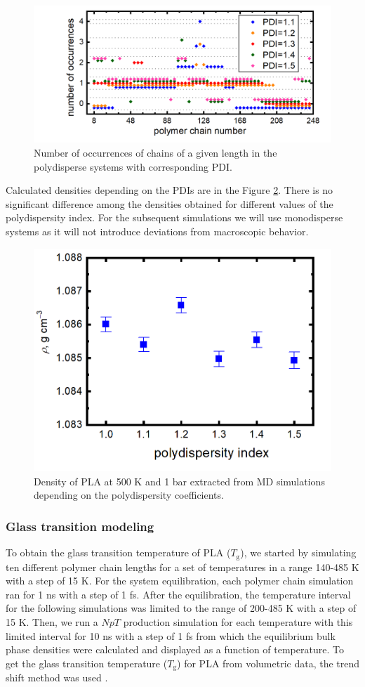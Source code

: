 \begin{figure}[htb]
	\centering
	\includegraphics[width=1\hsize]{img/polydispersity_occurences_new.png}
	\caption{Number of occurrences of chains of a given length in the polydisperse systems with corresponding PDI.}
	\label{fig:polydisperzita_vyskyt}
\end{figure}       

Calculated densities depending on the PDIs are in the Figure \ref{fig:polydisperzita}. There is no significant difference among the densities obtained for different values of the polydispersity index. For the subsequent simulations we will use monodisperse systems as it will not introduce deviations from macroscopic behavior. 

\begin{figure}[htb]
	\centering
	\includegraphics[width=0.5\hsize]{img/polydisperzita_new.png}
	\caption{Density of PLA at 500 K and 1 bar extracted from MD simulations depending on the polydispersity coefficients.}
	\label{fig:polydisperzita}
\end{figure}       

\subsubsection{Glass transition modeling}
To obtain the glass transition temperature of PLA ($T_\mathrm{g}$), we started by simulating ten different polymer chain lengths for a set of temperatures in a range 140-485 K with a step of 15 K. For the system equilibration, each polymer chain simulation ran for 1 ns with a step of 1 fs. After the equilibration, the temperature interval for the following simulations was limited to the range of 200-485 K with a step of 15 K. Then, we run a $NpT$ production simulation for each temperature with this limited interval for 10 ns with a step of 1 fs from which the equilibrium bulk phase densities were calculated and displayed as a function of temperature. To get the glass transition temperature ($T_\mathrm{g}$) for PLA from volumetric data, the trend shift method was used \cite{klajmon_does_2022}. 

